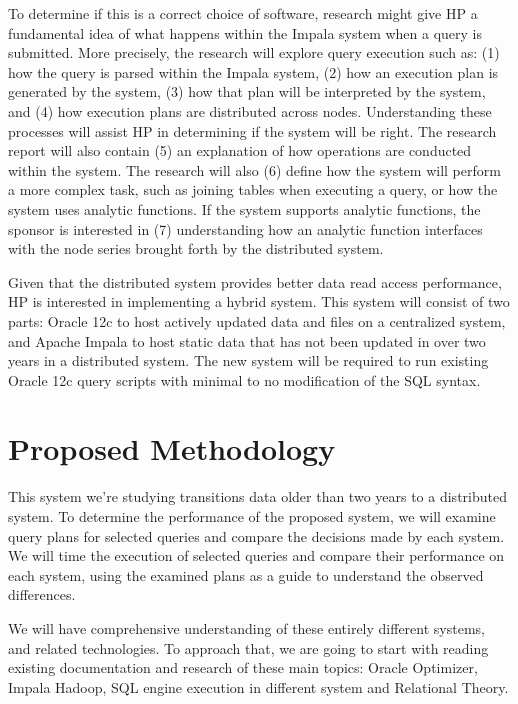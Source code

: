 \documentclass[onecolumn, draftclsnofoot,10pt, compsoc]{IEEEtran}
\begin{document}
 To determine if this is a correct choice of software, research might  give HP a fundamental idea of what happens within the Impala system when a query is submitted. More precisely, the research will  explore  query execution such as: (1) how the query is parsed within the Impala system, (2)  how an execution plan is generated by the system, (3) how that plan will be interpreted by the system, and (4) how execution plans are distributed across nodes. Understanding these processes will assist HP in determining if the system will be right.  The research report will also contain  (5) an explanation of how operations are conducted within the system. The research will also (6) define how the system will perform a more complex task, such as joining tables when executing a query, or how the system uses analytic functions. If the system supports analytic functions, the sponsor is interested in (7) understanding how an analytic function interfaces with the node series brought forth by the distributed system.


 Given that the distributed system provides better data read access performance, HP is interested in implementing a hybrid system. This system will consist of two parts: Oracle 12c to host actively updated data and files on a centralized system, and Apache Impala to host static data that has not been updated in over two years in a distributed system. The new system will be required to run existing Oracle 12c query scripts with minimal to no modification of the SQL syntax.

\section{Proposed Methodology}
This system we’re studying transitions data older than two years to a distributed system. To determine the performance of the proposed system, we will examine query plans for selected queries and compare the decisions made by each system. We will time the execution of selected queries and compare their performance on each system, using the examined plans as a guide to understand the observed differences.


We will have comprehensive understanding of these entirely different systems, and related technologies. To approach that, we are going to start with reading existing documentation and research of these main topics: Oracle Optimizer, Impala Hadoop, SQL engine execution in different system and Relational Theory.   
\end{document}
